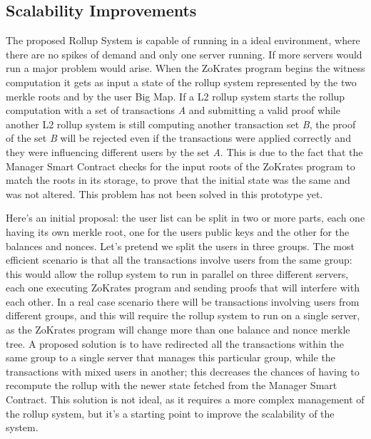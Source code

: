 \subsection{Scalability Improvements}

The proposed Rollup System is capable of running in a ideal environment, where there are no spikes of demand and only one server running. If more servers would run a major problem would arise. When the ZoKrates program begins the witness computation it gets as input a state of the rollup system represented by the two merkle roots and by the user Big Map. If a L2 rollup system starts the rollup computation with a set of transactions \textit{A} and submitting a valid proof while another L2 rollup system is still computing another transaction set \textit{B}, the proof of the set \textit{B} will be rejected even if the transactions were applied correctly and they were influencing different users by the set \textit{A}. This is due to the fact that the Manager Smart Contract checks for the input roots of the ZoKrates program to match the roots in its storage, to prove that the initial state was the same and was not altered. This problem has not been solved in this prototype yet.

Here's an initial proposal: the user list can be split in two or more parts, each one having its own merkle root, one for the users public keys and the other for the balances and nonces. Let's pretend we split the users in three groups. The most efficient scenario is that all the transactions involve users from the same group: this would allow the rollup system to run in parallel on three different servers, each one executing ZoKrates program and sending proofs that will interfere with each other. In a real case scenario there will be transactions involving users from different groups, and this will require the rollup system to run on a single server, as the ZoKrates program will change more than one balance and nonce merkle tree. A proposed solution is to have redirected all the transactions within the same group to a single server that manages this particular group, while the transactions with mixed users in another; this decreases the chances of having to recompute the rollup with the newer state fetched from the Manager Smart Contract. This solution is not ideal, as it requires a more complex management of the rollup system, but it's a starting point to improve the scalability of the system.